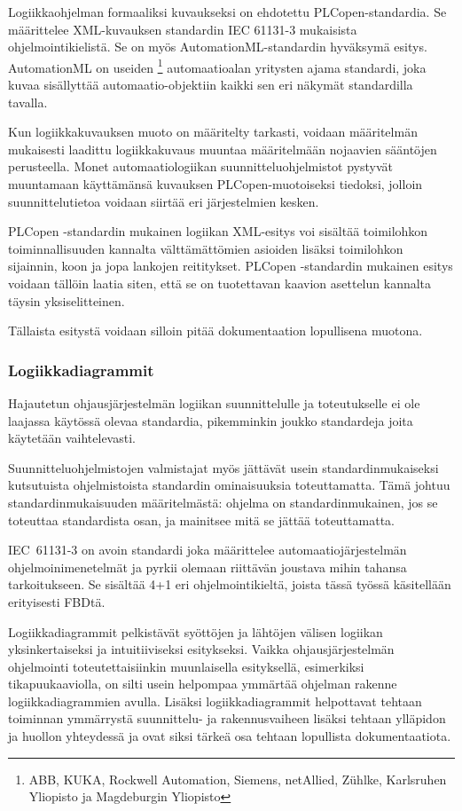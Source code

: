 \documentclass[finnish,12pt]{article}
\begin{document}
Logiikkaohjelman formaaliksi kuvaukseksi on ehdotettu PLCopen-standardia.
Se määrittelee XML-kuvauksen standardin IEC 61131-3 mukaisista ohjelmointikielistä.
Se on myös AutomationML-standardin hyväksymä esitys.
AutomationML on useiden \footnote{ABB, KUKA, Rockwell Automation, Siemens, netAllied, Zühlke, Karlsruhen Yliopisto ja Magdeburgin Yliopisto} automaatioalan yritysten ajama standardi, joka kuvaa sisällyttää automaatio-objektiin kaikki sen eri näkymät standardilla tavalla.

Kun logiikkakuvauksen muoto on määritelty tarkasti, voidaan määritelmän mukaisesti laadittu logiikkakuvaus muuntaa määritelmään nojaavien sääntöjen perusteella.
Monet automaatiologiikan suunnitteluohjelmistot pystyvät muuntamaan käyttämänsä kuvauksen PLCopen-muotoiseksi tiedoksi, jolloin suunnittelutietoa voidaan siirtää eri järjestelmien kesken.

PLCopen -standardin mukainen logiikan XML-esitys voi sisältää toimilohkon toiminnallisuuden kannalta välttämättömien asioiden lisäksi toimilohkon sijainnin, koon ja jopa lankojen reititykset.
PLCopen -standardin mukainen esitys voidaan tällöin laatia siten, että se on tuotettavan kaavion asettelun kannalta täysin yksiselitteinen.

Tällaista esitystä voidaan silloin pitää dokumentaation lopullisena muotona.


	\subsubsection{Logiikkadiagrammit}


Hajautetun ohjausjärjestelmän logiikan suunnittelulle ja toteutukselle ei ole laajassa käytössä olevaa standardia, pikemminkin joukko standardeja joita käytetään vaihtelevasti.

Suunnitteluohjelmistojen valmistajat myös jättävät usein standardinmukaiseksi kutsutuista ohjelmistoista standardin ominaisuuksia toteuttamatta.\cite{RefWorks:42}
Tämä johtuu standardinmukaisuuden määritelmästä: ohjelma on standardinmukainen, jos se toteuttaa standardista osan, ja mainitsee mitä se jättää toteuttamatta. 

IEC~61131-3 on avoin standardi joka määrittelee automaatiojärjestelmän ohjelmoinimenetelmät ja
 pyrkii olemaan riittävän joustava mihin tahansa tarkoitukseen. Se sisältää 4+1 eri
ohjelmointikieltä, joista tässä työssä käsitellään erityisesti FBDtä.

Logiikkadiagrammit pelkistävät syöttöjen ja lähtöjen välisen logiikan
yksinkertaiseksi ja intuitiiviseksi esitykseksi. Vaikka ohjausjärjestelmän
ohjelmointi toteutettaisiinkin muunlaisella esityksellä, esimerkiksi
tikapuukaaviolla, on silti usein helpompaa ymmärtää ohjelman rakenne
logiikkadiagrammien avulla. Lisäksi logiikkadiagrammit helpottavat tehtaan
toiminnan ymmärrystä suunnittelu- ja rakennusvaiheen lisäksi tehtaan ylläpidon
ja huollon yhteydessä ja ovat siksi tärkeä osa tehtaan lopullista
dokumentaatiota.
\end{document}
